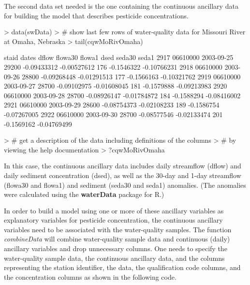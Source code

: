 \documentclass[11pt]{article}
\begin{document}
The second data set needed is the one containing the continuous ancillary data for building the model that describes pesticide concentrations.  
\vspace{5 mm}

\begin{Schunk}
\begin{Sinput}
> data(swData)
> # show last few rows of water-quality data for Missouri River at Omaha, Nebraska
> tail(cqwMoRivOmaha)
\end{Sinput}
\begin{Soutput}
        staid      dates dflow     flowa30      flowa1 dsed     seda30       seda1
2917 06610000 2003-09-25 29200 -0.09433312 -0.00527612  176 -0.1546322 -0.10766231
2918 06610000 2003-09-26 28800 -0.09268448 -0.01291513  177 -0.1566163 -0.10321762
2919 06610000 2003-09-27 28700 -0.09102975 -0.01608045  181 -0.1579888 -0.09213983
2920 06610000 2003-09-28 28700 -0.08926147 -0.01784872  184 -0.1588294 -0.08416002
2921 06610000 2003-09-29 28600 -0.08754373 -0.02108233  189 -0.1586754 -0.07267005
2922 06610000 2003-09-30 28700 -0.08577546 -0.02133474  201 -0.1569162 -0.04769499
\end{Soutput}
\begin{Sinput}
> # get a description of the data including definitions of the columns
> # by viewing the help documentation
> ?cqwMoRivOmaha
\end{Sinput}
\end{Schunk}
\vspace{5 mm}

In this case, the continuous ancillary data includes daily streamflow (dflow) and daily sediment concentration (dsed), as well as the 30-day and 1-day streamflow (flowa30 and flowa1) and sediment (seda30 and seda1) anomalies.  (The anomalies were calculated using the \textbf{waterData} package for R.)

In order to build a model using one or more of these ancillary variables as explanatory variables for pesticide concentration, the continuous ancillary variables need to be associated with the water-quality samples.  The function \textit{combineData} will combine water-quality sample data and continuous (daily) ancillary variables and drop unnecessary columns.  One needs to specify the water-quality sample data, the continuous ancillary data, and the columns representing the station identifier, the data, the qualification code columns, and the concentration columns as shown in the following code.
\vspace{5 mm}
\end{document}
